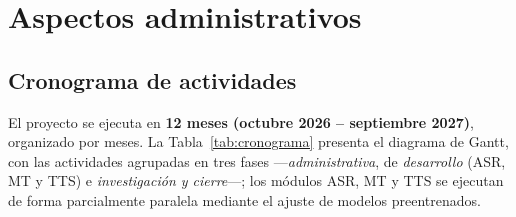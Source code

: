 \clearpage
\section{Aspectos administrativos}

\subsection{Cronograma de actividades}
El proyecto se ejecuta en \textbf{12 meses (octubre 2026 -- septiembre 2027)}, organizado por meses.
La Tabla~\ref{tab:cronograma} presenta el diagrama de Gantt, con las actividades agrupadas en tres
fases ---\emph{administrativa}, de \emph{desarrollo} (ASR, MT y TTS) e \emph{investigaci{\'o}n y
cierre}---; los m{\'o}dulos ASR, MT y TTS se ejecutan de forma parcialmente paralela mediante el
ajuste de modelos preentrenados.

\newcommand{\gbar}[5]{%
  \fill[#4,rounded corners=2.2pt] ({#2-1},{-#1+1-0.20}) rectangle ({#3},{-#1+1+0.20});%
  \node[anchor=west,align=left,text width=4.9cm,font=\scriptsize,text=black!80]
       at (-8.2,{-#1+1}) {#5};}

